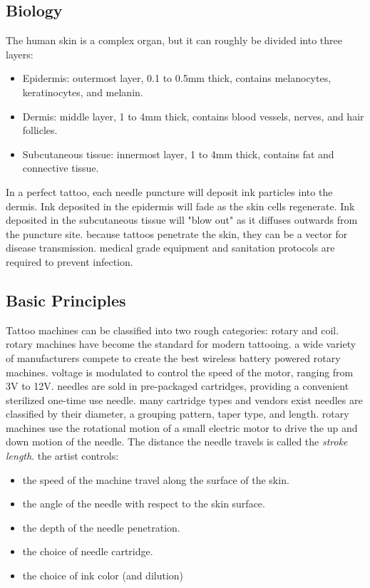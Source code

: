 \documentclass[11pt]{article}
\begin{document}
\subsection{Biology}

The human skin is a complex organ, but it can roughly be divided into three layers:

\begin{itemize}
    \item Epidermis: outermost layer, 0.1 to 0.5mm thick, contains melanocytes, keratinocytes, and melanin.
    \item Dermis: middle layer, 1 to 4mm thick, contains blood vessels, nerves, and hair follicles.
    \item Subcutaneous tissue: innermost layer, 1 to 4mm thick, contains fat and connective tissue.
\end{itemize}

In a perfect tattoo, each needle puncture will deposit ink particles into the dermis.
Ink deposited in the epidermis will fade as the skin cells regenerate.
Ink deposited in the subcutaneous tissue will "blow out" as it diffuses outwards from the puncture site.
because tattoos penetrate the skin, they can be a vector for disease transmission.
medical grade equipment and sanitation protocols are required to prevent infection.

\subsection{Basic Principles}

Tattoo machines can be classified into two rough categories: rotary and coil.
rotary machines have become the standard for modern tattooing.
a wide variety of manufacturers compete to create the best wireless battery powered rotary machines.
voltage is modulated to control the speed of the motor, ranging from 3V to 12V.
needles are sold in pre-packaged cartridges, providing a convenient sterilized one-time use needle.
many cartridge types and vendors exist
needles are classified by their diameter, a grouping pattern, taper type, and length.
rotary machines use the rotational motion of a small electric motor to drive the up and down motion of the needle.
The distance the needle travels is called the \textit{stroke length}.
the artist controls:
\begin{itemize}
    \item the speed of the machine travel along the surface of the skin.
    \item the angle of the needle with respect to the skin surface.
    \item the depth of the needle penetration.
    \item the choice of needle cartridge.
    \item the choice of ink color (and dilution)
\end{itemize}
\end{document}
